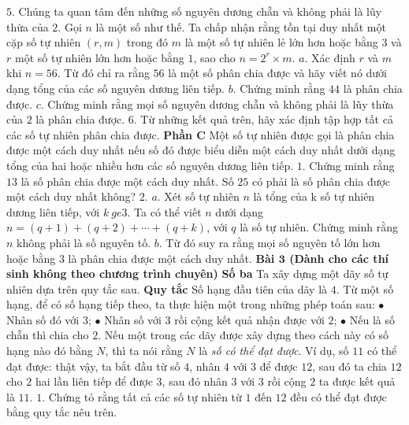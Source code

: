 \begin{multicols}{2}
	\vskip 0.05cm
	$5.$ Chúng ta quan tâm đến những số nguyên dương chẵn và không phải là lũy thừa của $2$. Gọi $n$ là một số như thế. Ta chấp nhận rằng tồn tại duy nhất một cặp số tự nhiên $(r,m)$ trong đó $m$ là một số tự nhiên lẻ lớn hơn hoặc bằng $3$ và $r$ một số tự nhiên lớn hơn hoặc bằng $1$, sao cho  $n=2^r\times m$.
	\vskip 0.05cm
	$a.$ Xác định $r$ và $m$ khi $n=56$. Từ đó chỉ ra rằng $56$ là một số phân chia được và hãy viết nó dưới dạng tổng của các số nguyên dương liên tiếp.
	\vskip 0.05cm
	$b.$ Chứng minh rằng $44$ là phân chia được.
	\vskip 0.05cm
	$c.$ Chứng minh rằng mọi  số nguyên dương chẵn và không phải là lũy thừa của $2$ là phân chia được. 
	\vskip 0.05cm
	$6.$ Từ những kết quả trên, hãy xác định tập hợp tất cả các số tự nhiên phân chia được.
	\vskip 0.05cm
	\textbf{\color{cackithi}Phần C}
	\vskip 0.05cm
	Một số tự nhiên được gọi là phân chia được một cách duy nhất nếu số đó được biểu diễn một cách duy nhất dưới dạng tổng của hai hoặc nhiều hơn các số nguyên dương liên tiếp.
	\vskip 0.05cm
	$1.$ Chứng minh rằng $13$ là số phân chia được một cách duy nhất. Số $25$ có phải là số phân chia được một cách duy nhất không?
	\vskip 0.05cm
	$2.$ $a.$ Xét số tự nhiên $n$ là tổng của k số tự nhiên dương liên tiếp, với $k\ ge3$. Ta có thể viết $n$ dưới dạng  $n=(q+1)+(q+2)+\cdots+(q+k)$, với $q$ là số tự nhiên. Chứng minh rằng $n$ không phải là số nguyên tố.
	\vskip 0.05cm
	$b$. Từ đó suy ra rằng mọi số nguyên tố lớn hơn hoặc bằng $3$ là phân chia được một cách duy nhất.
	\vskip 0.05cm
	\textbf{\color{cackithi}Bài $\pmb{3}$ (Dành cho các thí sinh không theo chương trình chuyên)}
	\vskip 0.05cm
	\textbf{\color{cackithi}Số ba}
	\vskip 0.05cm
	Ta xây dựng một dãy số tự nhiên dựa trên quy tắc sau.
	\vskip 0.05cm
	\textbf{\color{cackithi}Quy tắc}
	\vskip 0.05cm
	Số hạng đầu tiên của dãy là $4$.
	\vskip 0.05cm
	Từ một số hạng, để có số hạng tiếp theo, ta thực hiện một trong những phép toán sau:
	\vskip 0.05cm 
	$\bullet$ Nhân số đó với $3$;
	\vskip 0.05cm
	$\bullet$ Nhân số với $3$ rồi cộng kết quả nhận được với $2$;
	\vskip 0.05cm
	$\bullet$ Nếu là số chẵn thì chia cho $2$.
	\vskip 0.05cm
	Nếu một trong các dãy được xây dựng theo cách này có số hạng nào đó bằng $N$, thì ta nói rằng $N$ là \textit{số có thể đạt được}.
	\vskip 0.05cm 
	Ví dụ, số $11$ có thể đạt được: thật vậy, ta bắt đầu từ số $4$, nhân $4$ với $3$ để được $12$, sau đó ta chia $12$ cho $2$ hai lần liên tiếp để được $3$, sau đó nhân $3$ với $3$ rồi cộng $2$ ta được kết quả là $11$.
	\vskip 0.05cm 
	$1.$ Chứng tỏ rằng tất cả các số tự nhiên từ $1$ đến $12$ đều có thể đạt được bằng quy tắc nêu trên. 

\end{multicols}
